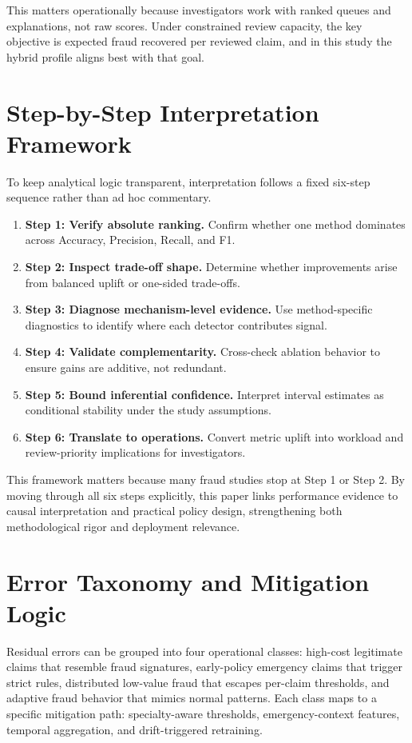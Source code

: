\documentclass[12pt,a4paper]{report}
\begin{document}
This matters operationally because investigators work with ranked queues and explanations, not raw scores. Under constrained review capacity, the key objective is expected fraud recovered per reviewed claim, and in this study the hybrid profile aligns best with that goal.

\section{Step-by-Step Interpretation Framework}
To keep analytical logic transparent, interpretation follows a fixed six-step sequence rather than ad hoc commentary.
\begin{enumerate}
\item \textbf{Step 1: Verify absolute ranking.} Confirm whether one method dominates across Accuracy, Precision, Recall, and F1.
\item \textbf{Step 2: Inspect trade-off shape.} Determine whether improvements arise from balanced uplift or one-sided trade-offs.
\item \textbf{Step 3: Diagnose mechanism-level evidence.} Use method-specific diagnostics to identify where each detector contributes signal.
\item \textbf{Step 4: Validate complementarity.} Cross-check ablation behavior to ensure gains are additive, not redundant.
\item \textbf{Step 5: Bound inferential confidence.} Interpret interval estimates as conditional stability under the study assumptions.
\item \textbf{Step 6: Translate to operations.} Convert metric uplift into workload and review-priority implications for investigators.
\end{enumerate}

This framework matters because many fraud studies stop at Step 1 or Step 2. By moving through all six steps explicitly, this paper links performance evidence to causal interpretation and practical policy design, strengthening both methodological rigor and deployment relevance.

\section{Error Taxonomy and Mitigation Logic}
Residual errors can be grouped into four operational classes: high-cost legitimate claims that resemble fraud signatures, early-policy emergency claims that trigger strict rules, distributed low-value fraud that escapes per-claim thresholds, and adaptive fraud behavior that mimics normal patterns. Each class maps to a specific mitigation path: specialty-aware thresholds, emergency-context features, temporal aggregation, and drift-triggered retraining.
\end{document}
